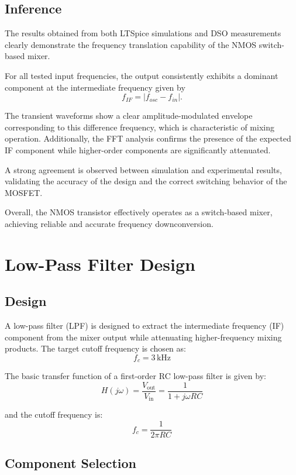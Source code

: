 \documentclass[conference]{IEEEtran}
\begin{document}
\subsection*{Inference}

The results obtained from both LTSpice simulations and DSO measurements clearly demonstrate the frequency translation capability of the NMOS switch-based mixer.

For all tested input frequencies, the output consistently exhibits a dominant component at the intermediate frequency given by
\[
f_{IF} = |f_{osc} - f_{in}|.
\]

The transient waveforms show a clear amplitude-modulated envelope corresponding to this difference frequency, which is characteristic of mixing operation. Additionally, the FFT analysis confirms the presence of the expected IF component while higher-order components are significantly attenuated.

A strong agreement is observed between simulation and experimental results, validating the accuracy of the design and the correct switching behavior of the MOSFET.

Overall, the NMOS transistor effectively operates as a switch-based mixer, achieving reliable and accurate frequency downconversion.

\section{Low-Pass Filter Design}

\subsection{Design}

A low-pass filter (LPF) is designed to extract the intermediate frequency (IF) component from the mixer output while attenuating higher-frequency mixing products. The target cutoff frequency is chosen as:
\[
f_c = 3\,\text{kHz}
\]

The basic transfer function of a first-order RC low-pass filter is given by:
\[
H(j\omega) = \frac{V_{\text{out}}}{V_{\text{in}}}
= \frac{1}{1 + j\omega RC}
\]

and the cutoff frequency is:
\[
f_c = \frac{1}{2\pi RC}
\]

\subsection{Component Selection}
\end{document}
